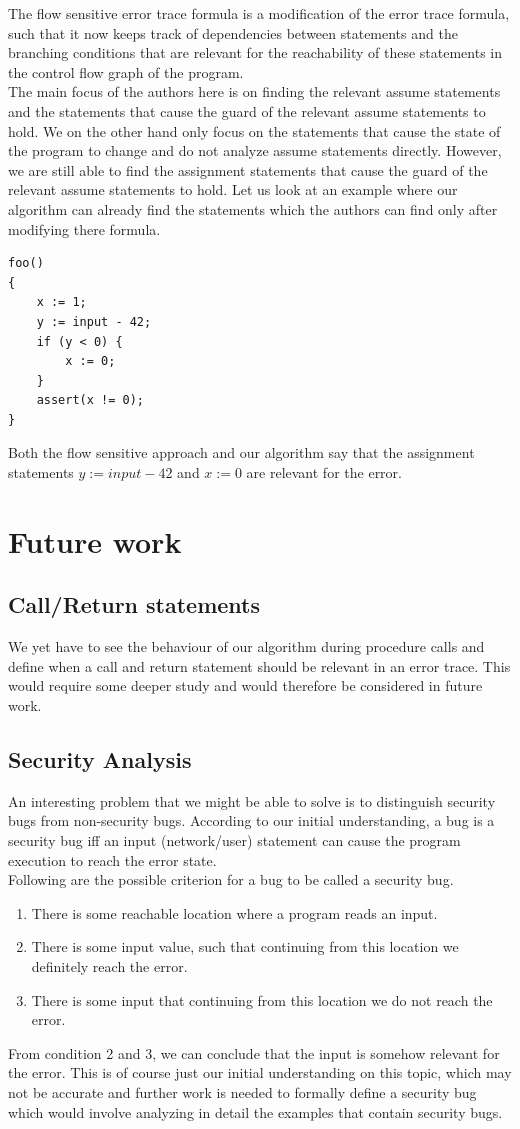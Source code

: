 \documentclass{article}
\begin{document}
The flow sensitive error trace formula is a modification of the error trace formula, such that it now keeps track of dependencies between statements and the branching conditions that are relevant for the reachability of these statements in the control flow graph of the program. \\
The main focus of the authors here is on finding the relevant assume statements and the statements that cause the guard of the relevant assume statements to hold. We on the other hand only focus on the statements that cause the state of the program to change and do not analyze assume statements directly. However, we are still able to find the assignment statements that cause the guard of the relevant assume statements to hold. Let us look at an example where our algorithm can already find the statements which the authors can find only after modifying there formula. 
\begin{lstlisting}
foo()
{
	x := 1;
	y := input - 42;
	if (y < 0) {
		x := 0;	
	}
	assert(x != 0);
}
\end{lstlisting}
Both the flow sensitive approach and our algorithm say that the assignment statements $y := input - 42$ and $x := 0$ are relevant for the error.
\section{Future work}
\subsection{Call/Return statements}
We yet have to see the behaviour of our algorithm during procedure calls and define when a call and return statement should be relevant in an error trace. This would require some deeper study and would therefore be considered in future work.
\subsection{Security Analysis}
An interesting problem that we might be able to solve is to distinguish security bugs from non-security bugs. According to our initial understanding, a bug is a security bug iff an input (network/user) statement can cause the program execution to reach the error state. \\
Following are the possible criterion for a bug to be called a security bug.
\begin{enumerate}
  \item There  is some reachable location where a program reads an input.
  \item There is some input value, such that continuing from this location we definitely reach the error.
  \item There is some input that continuing from this location we do not reach the error.
\end{enumerate}
From condition 2 and 3, we can conclude that the input is somehow relevant for the error. This is of course just our initial understanding on this topic, which may not be accurate and further work is needed to formally define a security bug which would involve analyzing in detail the examples that contain security bugs.
\newpage
\end{document}
